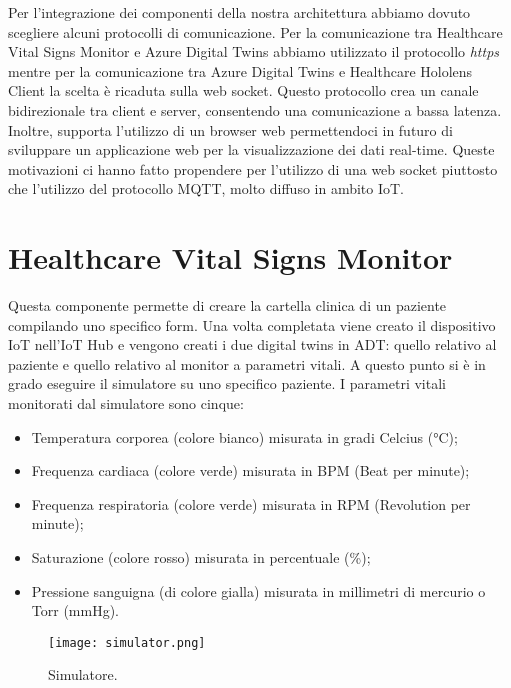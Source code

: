 Per l'integrazione dei componenti della nostra architettura abbiamo dovuto scegliere alcuni protocolli di comunicazione. \newline \newline Per la comunicazione tra Healthcare Vital Signs Monitor e Azure Digital Twins abbiamo utilizzato il protocollo \textit{https} mentre per la comunicazione tra Azure Digital Twins e Healthcare Hololens Client la scelta è ricaduta sulla web socket. Questo protocollo crea un canale bidirezionale tra client e server, consentendo una comunicazione a bassa latenza. Inoltre, supporta l'utilizzo di un browser web permettendoci in futuro di sviluppare un applicazione web per la visualizzazione dei dati real-time. Queste motivazioni ci hanno fatto propendere per l'utilizzo di una web socket piuttosto che l'utilizzo del protocollo MQTT, molto diffuso in ambito IoT.

\section{Healthcare Vital Signs Monitor}
Questa componente permette di creare la cartella clinica di un paziente compilando uno specifico form. Una volta completata viene creato il dispositivo IoT nell'IoT Hub e vengono creati i due digital twins in ADT: quello relativo al paziente e quello relativo al monitor a parametri vitali. A questo punto si è in grado eseguire il simulatore su uno specifico paziente. I parametri vitali monitorati dal simulatore sono cinque:

\begin{itemize}
    \item Temperatura corporea (colore bianco) misurata in gradi Celcius (°C);
    \item Frequenza cardiaca (colore verde) misurata in BPM (Beat per minute);
    \item Frequenza respiratoria (colore verde) misurata in RPM (Revolution per minute);
    \item Saturazione (colore rosso) misurata in percentuale (\%);
    \item Pressione sanguigna (di colore gialla) misurata in millimetri di mercurio o Torr (mmHg).
\end{itemize}

\begin{figure}[ht]
    \texttt{[image: simulator.png]}
    \centering
    \caption{\label{pic:simulator}Simulatore.}
\end{figure}

